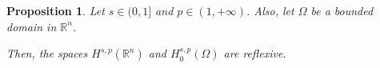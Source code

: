 \documentclass[11pt,hyp,]{nyjm}
\numberwithin{equation}{section}
\newcommand{\R}{\mathbb{R}}
\newtheorem{corollary}[theorem]{Corollary}
\newtheorem{proposition}[theorem]{Proposition}
\theoremstyle{remark}
\begin{document}

\begin{proposition}\label{ascmtm}
Let $s \in (0,1]$ and $p \in(1,+\infty)$. Also, let $\Omega$ be a bounded domain in $\R^n$.


Then, the spaces $H^{s,p}(\R^n)$ and $H^{s,p}_0(\Omega)$ are reflexive.
\end{proposition}
\end{document}
